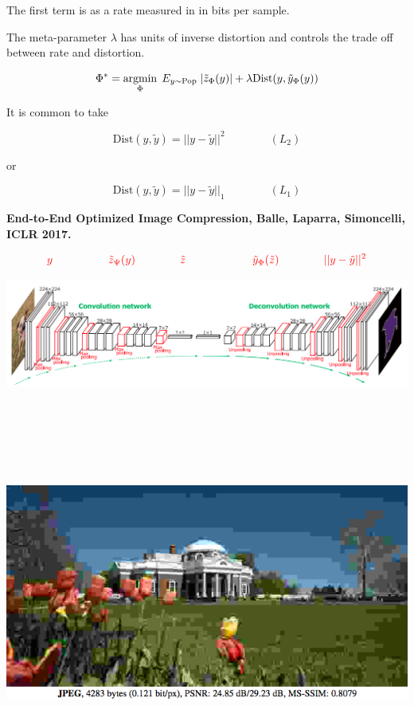 {\vfill
The first term is as a rate measured in in bits per sample.

\vfill
The meta-parameter $\lambda$ has units of inverse distortion and controls the trade off between rate and distortion.


$$\Phi^* = \operatorname*{argmin}_\Phi\;E_{y \sim \mathrm{Pop}}\;|\tilde{z}_\Phi(y)| + \lambda \mathrm{Dist}(y,\tilde{y}_\Phi(y))$$

\vfill
It is common to take

$$\mathrm{Dist}(y,\tilde{y}) = ||y-\tilde{y}||^2 \hspace{4em}(L_2)$$

\vfill
or

$$\mathrm{Dist}(y,\tilde{y}) = ||y-\tilde{y}||_1 \hspace{4em} (L_1)$$


{\bf End-to-End Optimized Image Compression, Balle, Laparra, Simoncelli, ICLR 2017.}


\vfill
$${\color{red}y \hspace{5em}  \tilde{z}_\Psi(y) \hspace{4em} \tilde{z} \hspace{6em} \tilde{y}_\Phi(\tilde{z}) \hspace{4em}||y - \tilde{y}||^2}$$
\centerline{\includegraphics[width=9in]{../images/Deconv}}


\bigskip
\centerline{\includegraphics[height=5in]{../images/RateDist2}}

}

